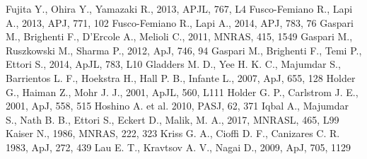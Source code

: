 \documentclass[a4paper,fleqn,usenatbib]{mnras}
\begin{document}
{\begin{thebibliography}{}
Fujita Y., Ohira Y., Yamazaki R., 2013, APJL, 767, L4
Fusco-Femiano R., Lapi A., 2013, APJ, 771, 102
Fusco-Femiano R., Lapi A., 2014, APJ, 783, 76
Gaspari M., Brighenti F., D'Ercole A., Melioli C., 2011, MNRAS, 415, 1549
Gaspari M., Ruszkowski M., Sharma P., 2012, ApJ, 746, 94
Gaspari M., Brighenti F., Temi P., Ettori S., 2014, ApJL, 783, L10
Gladders M. D., Yee H. K. C., Majumdar S., Barrientos L. F., Hoekstra H., Hall P. B., Infante L., 2007, ApJ, 655, 128
Holder G., Haiman Z., Mohr J. J., 2001, ApJL, 560, L111
Holder G. P., Carlstrom J. E., 2001, ApJ, 558, 515
Hoshino A. et al. 2010, PASJ, 62, 371
Iqbal A., Majumdar S., Nath B. B., Ettori S., Eckert D.,  Malik, M. A., 2017, 
MNRASL, 465, L99
Kaiser N., 1986, MNRAS, 222, 323
Kriss G. A., Cioffi D. F., Canizares C. R. 1983, ApJ, 272, 439
 Lau E. T., Kravtsov A. V., Nagai D., 2009, ApJ, 705,  1129

\end{thebibliography}}
\end{document}
